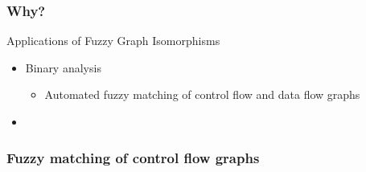 


\begin{frame}
	\frametitle{Why?}

	\begin{block}{Applications of Fuzzy Graph Isomorphisms}
		\begin{itemize}
			\item Binary analysis
			\begin{itemize}
				\item Automated fuzzy matching of control flow and data flow graphs
			\end{itemize}
			\item {}
		\end{itemize}
	\end{block}
\end{frame}

\begin{frame}
	\frametitle{Fuzzy matching of control flow graphs}

\end{frame}
